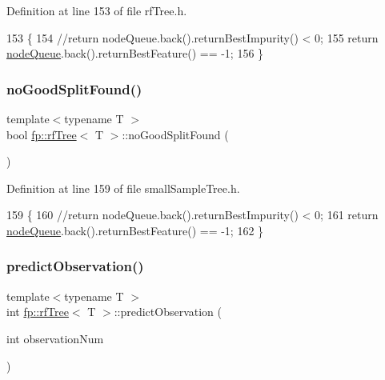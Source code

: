 Definition at line 153 of file rf\+Tree.\+h.


\begin{DoxyCode}
153                                               \{
154                     \textcolor{comment}{//return nodeQueue.back().returnBestImpurity() < 0;}
155                     \textcolor{keywordflow}{return} \hyperlink{classfp_1_1rfTree_af72d0a2f930fd480dfb4858885c2df23}{nodeQueue}.back().returnBestFeature() == -1;
156                 \}
\end{DoxyCode}
\mbox{\label{classfp_1_1rfTree_a618bdc2d22267b4bb4f5e1881b1788f6}} 
\subsubsection{\texorpdfstring{no\+Good\+Split\+Found()}{noGoodSplitFound()}\hspace{0.1cm}{\footnotesize\ttfamily [2/2]}}
{\footnotesize\ttfamily template$<$typename T $>$ \\
bool \hyperlink{classfp_1_1rfTree}{fp\+::rf\+Tree}$<$ T $>$\+::no\+Good\+Split\+Found (\begin{DoxyParamCaption}{ }\end{DoxyParamCaption})\hspace{0.3cm}{\ttfamily [inline]}}



Definition at line 159 of file small\+Sample\+Tree.\+h.


\begin{DoxyCode}
159                                               \{
160                     \textcolor{comment}{//return nodeQueue.back().returnBestImpurity() < 0;}
161                     \textcolor{keywordflow}{return} \hyperlink{classfp_1_1rfTree_af72d0a2f930fd480dfb4858885c2df23}{nodeQueue}.back().returnBestFeature() == -1;
162                 \}
\end{DoxyCode}
\mbox{\label{classfp_1_1rfTree_aad66c44e2062c163b1560f9bf1bd759f}} 
\subsubsection{\texorpdfstring{predict\+Observation()}{predictObservation()}\hspace{0.1cm}{\footnotesize\ttfamily [1/2]}}
{\footnotesize\ttfamily template$<$typename T $>$ \\
int \hyperlink{classfp_1_1rfTree}{fp\+::rf\+Tree}$<$ T $>$\+::predict\+Observation (\begin{DoxyParamCaption}\item[{int}]{observation\+Num }\end{DoxyParamCaption})\hspace{0.3cm}{\ttfamily [inline]}}



